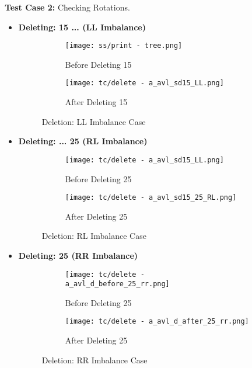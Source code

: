 \documentclass{article}
\begin{document}
\textbf{Test Case 2:} Checking Rotations.
\begin{itemize}
    \item \textbf{Deleting: 15 ... (LL Imbalance)}\newline
        \begin{figure}[H]
            \begin{subfigure}{0.5\textwidth}
                \centering
                \texttt{[image: ss/print - tree.png]} 
                \caption{Before Deleting 15}
            \end{subfigure}
            \begin{subfigure}{0.5\textwidth}
                \centering
                \texttt{[image: tc/delete - a\_avl\_sd15\_LL.png]}
                \caption{After Deleting 15}
            \end{subfigure}
            \caption{Deletion: LL Imbalance Case}
        \label{fig:Deletion_TC_LL}
        \end{figure}
        
    \item \textbf{Deleting: ... 25 (RL Imbalance)}\newline
        \begin{figure}[H]
            \begin{subfigure}{0.5\textwidth}
                \centering
                \texttt{[image: tc/delete - a\_avl\_sd15\_LL.png]} 
                \caption{Before Deleting 25}
            \end{subfigure}
            \begin{subfigure}{0.5\textwidth}
                \centering
                \texttt{[image: tc/delete - a\_avl\_sd15\_25\_RL.png]}
                \caption{After Deleting 25}
            \end{subfigure}
            \caption{Deletion: RL Imbalance Case}
        \label{fig:Deletion_TC_RL}
        \end{figure}
        
    \item \textbf{Deleting: 25 (RR Imbalance)}\newline
        \begin{figure}[H]
            \begin{subfigure}{0.5\textwidth}
                \centering
                \texttt{[image: tc/delete - a\_avl\_d\_before\_25\_rr.png]} 
                \caption{Before Deleting 25}
            \end{subfigure}
            \begin{subfigure}{0.5\textwidth}
                \centering
                \texttt{[image: tc/delete - a\_avl\_d\_after\_25\_rr.png]}
                \caption{After Deleting 25}
            \end{subfigure}
            \caption{Deletion: RR Imbalance Case}
        \label{fig:Deletion_TC_RR}
        \end{figure}
        

\end{itemize}
\end{document}
